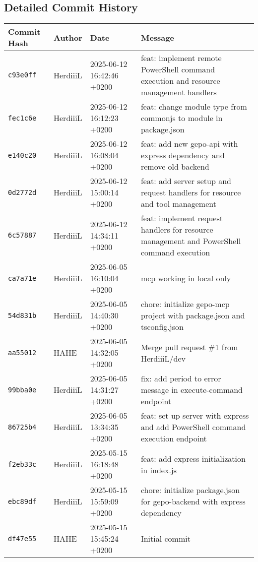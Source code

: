\subsection*{Detailed Commit History}
\begin{longtable}{llll}
\toprule
Commit Hash & Author & Date & Message \\
\midrule
\texttt{c93e0ff} & HerdiiiL & 2025-06-12 16:42:46 +0200 & feat: implement remote PowerShell command execution and resource management handlers \\
\texttt{fec1c6e} & HerdiiiL & 2025-06-12 16:12:23 +0200 & feat: change module type from commonjs to module in package.json \\
\texttt{e140c20} & HerdiiiL & 2025-06-12 16:08:04 +0200 & feat: add new gepo-api with express dependency and remove old backend \\
\texttt{0d2772d} & HerdiiiL & 2025-06-12 15:00:14 +0200 & feat: add server setup and request handlers for resource and tool management \\
\texttt{6c57887} & HerdiiiL & 2025-06-12 14:34:11 +0200 & feat: implement request handlers for resource management and PowerShell command execution \\
\texttt{ca7a71e} & HerdiiiL & 2025-06-05 16:10:04 +0200 & mcp working in local only \\
\texttt{54d831b} & HerdiiiL & 2025-06-05 14:40:30 +0200 & chore: initialize gepo-mcp project with package.json and tsconfig.json \\
\texttt{aa55012} & HAHE & 2025-06-05 14:32:05 +0200 & Merge pull request \#1 from HerdiiiL/dev \\
\texttt{99bba0e} & HerdiiiL & 2025-06-05 14:31:27 +0200 & fix: add period to error message in execute-command endpoint \\
\texttt{86725b4} & HerdiiiL & 2025-06-05 13:34:35 +0200 & feat: set up server with express and add PowerShell command execution endpoint \\
\texttt{f2eb33c} & HerdiiiL & 2025-05-15 16:18:48 +0200 & feat: add express initialization in index.js \\
\texttt{ebc89df} & HerdiiiL & 2025-05-15 15:59:09 +0200 & chore: initialize package.json for gepo-backend with express dependency \\
\texttt{df47e55} & HAHE & 2025-05-15 15:45:24 +0200 & Initial commit \\
\bottomrule
\end{longtable}
